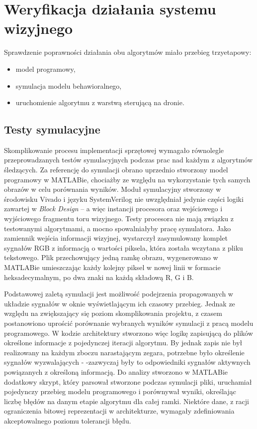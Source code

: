 \chapter{Weryfikacja działania systemu wizyjnego}

Sprawdzenie poprawności działania obu algorytmów miało przebieg trzyetapowy:
\begin{itemize}
	\item model programowy,
	\item symulacja modelu behawioralnego,
	\item uruchomienie algorytmu z warstwą sterującą na dronie.
\end{itemize}

\section{Testy symulacyjne}

Skomplikowanie procesu implementacji sprzętowej wymagało równolegle przeprowadzanych testów symulacyjnych podczas prac nad każdym z algorytmów śledzących. %
Za referencję do symulacji obrano uprzednio stworzony model programowy w MATLABie, chociażby ze względu na wykorzystanie tych samych obrazów w celu porównania wyników. %
Moduł symulacyjny stworzony w środowisku Vivado i języku SystemVerilog nie uwzględniał jedynie części logiki zawartej w \textit{Block Design} -- a więc instancji procesora oraz wejściowego i wyjściowego fragmentu toru wizyjnego. 
Testy procesora nie mają związku z testowanymi algorytmami, a mocno spowalniałyby pracę symulatora. %
Jako zamiennik wejścia informacji wizyjnej, wystarczył zasymulowany komplet sygnałów RGB z informacją o wartości piksela, która została wczytana z pliku tekstowego. 
Plik przechowujący jedną ramkę obrazu, wygenerowano w MATLABie umieszczając każdy kolejny piksel w nowej linii w formacie heksadecymalnym, po dwa znaki na każdą składową R, G i B.

Podstawowej zaletą symulacji jest możliwość podejrzenia propagowanych w układzie sygnałów w oknie wyświetlającym ich czasowy przebieg. %
Jednak ze względu na zwiększający się poziom skomplikowania projektu, z czasem postanowiono uprościć porównanie wybranych wyników symulacji z pracą modelu programowego. %
W kodzie architektury stworzono więc logikę zapisującą do plików określone informacje z pojedynczej iteracji algorytmu. 
By jednak zapis nie był realizowany na każdym zboczu narastającym zegara, potrzebne było określenie sygnałów wyzwalających - -zazwyczaj były to odpowiedniki sygnałów aktywnych powiązanych z określoną informacją. 
Do analizy stworzono w MATLABie dodatkowy skrypt, który parsował stworzone podczas symulacji pliki, uruchamiał pojedynczy przebieg modelu programowego i porównywał wyniki, określając liczbę błędów na danym etapie algorytmu dla całej ramki. 
Niektóre dane, z racji ograniczenia bitowej reprezentacji w architekturze, wymagały zdefiniowania akceptowalnego poziomu tolerancji błędu.



